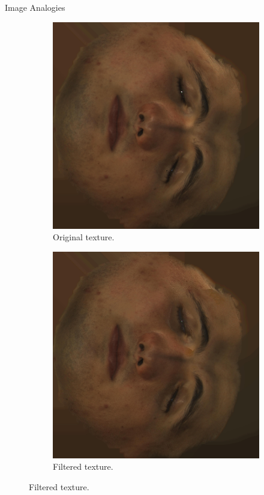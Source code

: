 \documentclass{beamer}
\begin{document}

\begin{frame}{Image Analogies}

\begin{figure}
        \centering
        \begin{subfigure}[b]{0.45\textwidth}
                \includegraphics[width=\textwidth]{img/tex_richard}
                \caption{Original texture.}
        \end{subfigure}
        \begin{subfigure}[b]{0.45\textwidth}
                \includegraphics[width=\textwidth]{img/tex_richard_ai}
                \caption{Filtered texture.}
        \end{subfigure}
\end{figure}


\end{frame}
\end{document}
